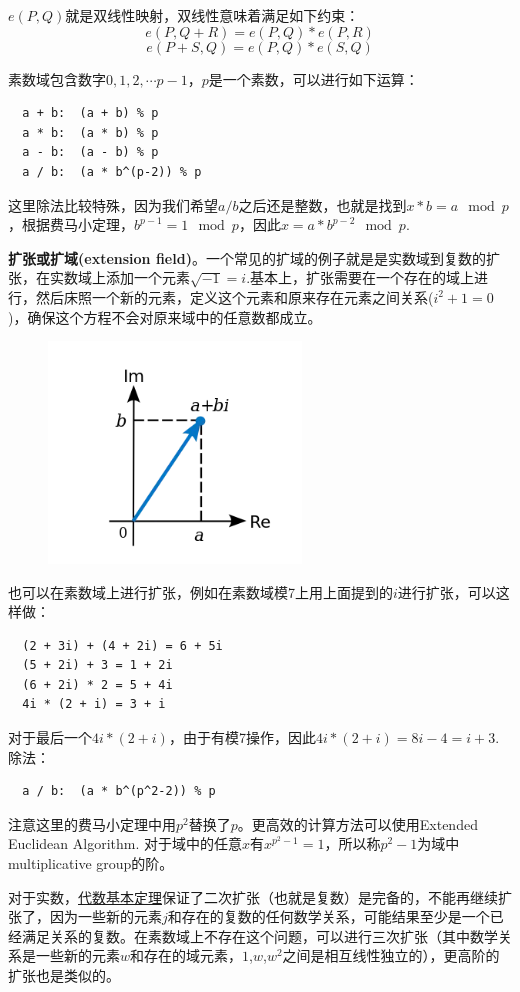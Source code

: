 \documentclass[10pt]{ctexart}
\begin{document}
$e(P,Q)$就是双线性映射，双线性意味着满足如下约束：
$$
e(P,Q+R)=e(P,Q) * e(P,R) 
$$
$$
e(P+S,Q) = e(P,Q) * e(S,Q)
$$

素数域包含数字$0,1,2,\cdots p-1$，$p$是一个素数，可以进行如下运算：
\begin{lstlisting}
  a + b:  (a + b) % p
  a * b:  (a * b) % p
  a - b:  (a - b) % p
  a / b:  (a * b^(p-2)) % p
\end{lstlisting}
这里除法比较特殊，因为我们希望$a/b$之后还是整数，也就是找到$x * b = a \mod p$，根据费马小定理，$b^{p-1} = 1 \mod p$，因此$x = a * b^{p-2} \mod p$.

\textbf{扩张或扩域(extension field)}。一个常见的扩域的例子就是是实数域到复数的扩张，在实数域上添加一个元素$\sqrt{-1}=i$.基本上，扩张需要在一个存在的域上进行，然后床照一个新的元素，定义这个元素和原来存在元素之间关系($i^2 + 1 = 0$)，确保这个方程不会对原来域中的任意数都成立。
\begin{figure}[H]
	\centering
	\includegraphics[width=0.6\textwidth]{img/ExploringEllipticCurvePairings/extension_field.png}
\end{figure}
也可以在素数域上进行扩张，例如在素数域模7上用上面提到的$i$进行扩张，可以这样做：
\begin{lstlisting}
  (2 + 3i) + (4 + 2i) = 6 + 5i
  (5 + 2i) + 3 = 1 + 2i
  (6 + 2i) * 2 = 5 + 4i
  4i * (2 + i) = 3 + i
\end{lstlisting}
对于最后一个$4i * (2 + i)$，由于有模7操作，因此$4i * (2 + i) = 8i - 4 = i + 3$. 除法：
\begin{lstlisting}
  a / b:  (a * b^(p^2-2)) % p
\end{lstlisting}
注意这里的费马小定理中用$p^2$替换了$p$。更高效的计算方法可以使用Extended Euclidean Algorithm. 对于域中的任意$x$有$x^{p^2-1}=1$，所以称$p^2-1$为域中multiplicative group的阶。

对于实数，\href{https://en.wikipedia.org/wiki/Fundamental_theorem_of_algebra}{代数基本定理}保证了二次扩张（也就是复数）是完备的，不能再继续扩张了，因为一些新的元素$j$和存在的复数的任何数学关系，可能结果至少是一个已经满足关系的复数。在素数域上不存在这个问题，可以进行三次扩张（其中数学关系是一些新的元素$w$和存在的域元素，$1$,$w$,$w^2$之间是相互线性独立的），更高阶的扩张也是类似的。
\end{document}
